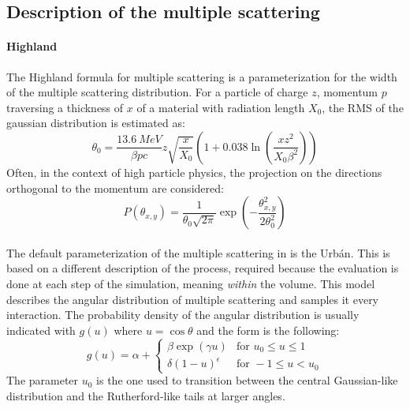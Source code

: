 \begin{refsection}
    \subsection{Description of the multiple scattering}
        \paragraph{Highland}
        The Highland formula for multiple scattering is a parameterization for the width of the multiple scattering distribution.
        For a particle of charge $z$, momentum $p$ traversing a thickness of $x$ of a material with radiation length $X_0$, the RMS of the gaussian distribution is estimated as:
        \begin{equation}
        \label{eq:highland}
        \theta_0 = \frac{\SI{13.6}{MeV}}{\beta p c} z \sqrt{\frac{x}{X_0}} \left(1 + 0.038 \ln( \frac{x z^2}{X_0 \beta^2}) \right)
        \end{equation}
        Often, in the context of high particle physics, the projection on the directions orthogonal to the momentum are considered:
        \begin{equation}
        P(\theta_{x,y}) = \frac{1}{{\theta_0 \sqrt{2\pi}}} \exp\left(-\frac{\theta_{x,y}^2}{2\theta_0^2}\right)
        \end{equation}

        \paragraph{\gf}
        The default parameterization of the multiple scattering in \gf is the Urb\'{a}n. 
        This is based on a different description of the process, required because the evaluation is done at each step of the simulation, meaning \textit{within} the volume.
        This model describes the angular distribution of multiple scattering and samples it every interaction.
        The probability density of the angular distribution is usually indicated with $g(u)$ where $u = \cos \theta$ and the form is the following:
        \begin{equation}
            g(u) = \alpha +
            \begin{cases}
                \beta \exp(\gamma u) &\text{for } u_0 \le u \le 1 \\
                \delta (1-u)^\epsilon &\text{for } -1 \le u < u_0
            \end{cases}
        \end{equation}
        The parameter $u_0$ is the one used to transition between the central Gaussian-like distribution and the Rutherford-like tails at larger angles.\\


\end{refsection}
